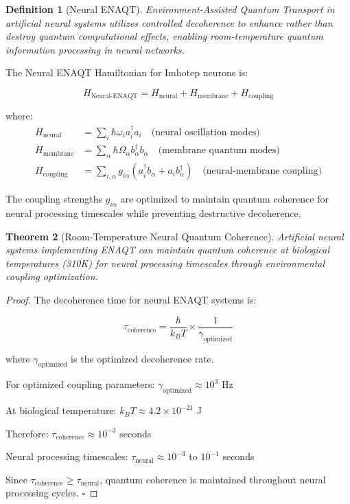 \documentclass[12pt,a4paper]{article}
\newtheorem{theorem}{Theorem}[section]
\newtheorem{definition}[theorem]{Definition}
\theoremstyle{remark}
\begin{document}
\begin{definition}[Neural ENAQT]
Environment-Assisted Quantum Transport in artificial neural systems utilizes controlled decoherence to enhance rather than destroy quantum computational effects, enabling room-temperature quantum information processing in neural networks.
\end{definition}

The Neural ENAQT Hamiltonian for Imhotep neurons is:

\begin{equation}
H_{\text{Neural-ENAQT}} = H_{\text{neural}} + H_{\text{membrane}} + H_{\text{coupling}}
\end{equation}

where:
\begin{align}
H_{\text{neural}} &= \sum_{i} \hbar \omega_i a_i^\dagger a_i \quad \text{(neural oscillation modes)} \\
H_{\text{membrane}} &= \sum_{\alpha} \hbar \Omega_\alpha b_\alpha^\dagger b_\alpha \quad \text{(membrane quantum modes)} \\
H_{\text{coupling}} &= \sum_{i,\alpha} g_{i\alpha} (a_i^\dagger b_\alpha + a_i b_\alpha^\dagger) \quad \text{(neural-membrane coupling)}
\end{align}

The coupling strengths $g_{i\alpha}$ are optimized to maintain quantum coherence for neural processing timescales while preventing destructive decoherence.

\begin{theorem}[Room-Temperature Neural Quantum Coherence]
Artificial neural systems implementing ENAQT can maintain quantum coherence at biological temperatures (310K) for neural processing timescales through environmental coupling optimization.
\end{theorem}

\begin{proof}
The decoherence time for neural ENAQT systems is:

\begin{equation}
\tau_{\text{coherence}} = \frac{\hbar}{k_B T} \times \frac{1}{\gamma_{\text{optimized}}}
\end{equation}

where $\gamma_{\text{optimized}}$ is the optimized decoherence rate.

For optimized coupling parameters: $\gamma_{\text{optimized}} \approx 10^3$ Hz

At biological temperature: $k_B T \approx 4.2 \times 10^{-21}$ J

Therefore: $\tau_{\text{coherence}} \approx 10^{-3}$ seconds

Neural processing timescales: $\tau_{\text{neural}} \approx 10^{-3}$ to $10^{-1}$ seconds

Since $\tau_{\text{coherence}} \geq \tau_{\text{neural}}$, quantum coherence is maintained throughout neural processing cycles. $\square$
\end{proof}
\end{document}
